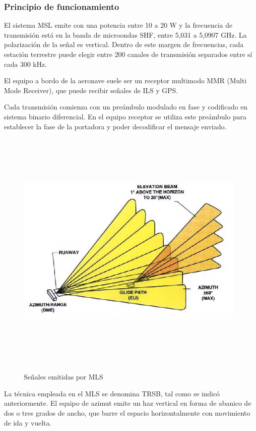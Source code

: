 \subsubsection{Principio de funcionamiento}
\label{sec:06.MLS.principio.funcionamiento}

El sistema MSL emite con una potencia entre 10 a 20 W y la frecuencia de transmisión está en la
banda de microondas SHF, entre 5,031 a 5,0907 GHz. La polarización de la señal es vertical. Dentro
de este margen de frecuencias, cada estación terrestre puede elegir entre 200 canales de transmisión
separados entre sí cada 300 kHz.

El equipo a bordo de la aeronave suele ser un receptor multimodo MMR (Multi Mode Receiver),
que puede recibir señales de ILS y GPS.

Cada transmisión comienza con un preámbulo modulado en fase y codificado en sistema binario
diferencial. En el equipo receptor se utiliza este preámbulo para establecer la fase de la portadora y
poder decodificar el mensaje enviado.

\begin{figure}[!htb]
  \centering
  {\includegraphics[height=12cm]{06.radionavegacion/Imagenes/06.Sistemas.Aproximacion/06_MLS_006.png} }
  \caption{Señales emitidas por MLS}
  \label{fig:06.MLS.seniales.emitidas}
\end{figure}


La técnica empleada en el MLS se denomina TRSB, tal como se indicó anteriormente. El equipo
de azimut emite un haz vertical en forma de abanico de dos o tres grados de ancho, que barre el
espacio horizontalmente con movimiento de ida y vuelta.

